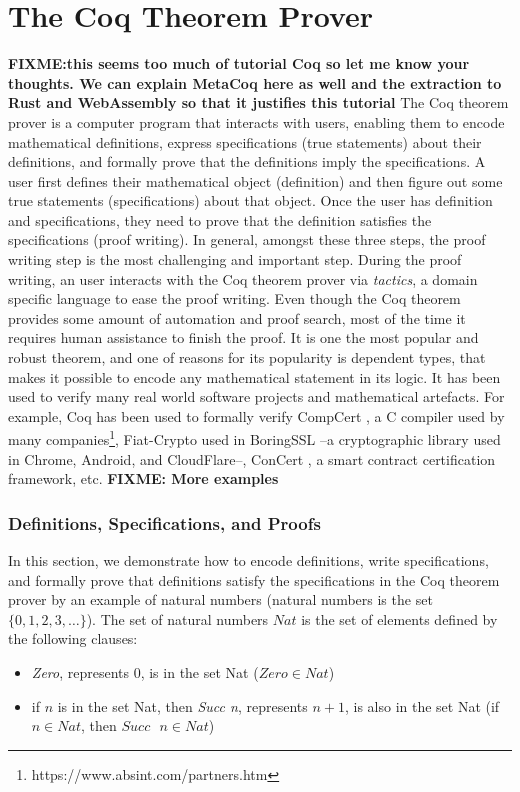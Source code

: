 \documentclass[conference,compsoc]{IEEEtran}
\begin{document}
\section{The Coq Theorem Prover}
\textbf{FIXME:this seems too much of tutorial Coq so let me know your thoughts. We 
can explain MetaCoq here as well and the extraction to Rust and WebAssembly
so that it justifies this tutorial}
The Coq theorem prover \cite{the_coq_development_team} is a computer program that interacts with users, 
enabling them to encode mathematical definitions, express specifications (true statements) about 
their definitions, and formally prove that the definitions imply the specifications. 
A user first defines their mathematical object (definition) and then figure 
out some  true statements (specifications) about 
that object. Once the user has definition 
and specifications, they need to prove 
that the definition satisfies the specifications 
(proof writing). In general, amongst these three steps, 
the proof writing step is the most challenging and important step. 
During the proof writing, an user interacts with the Coq theorem prover 
via \emph{tactics}, a domain specific language 
to ease the proof writing. Even though the Coq theorem 
provides some amount of automation and proof 
search, most of the time it requires human assistance to finish the proof. 
It is one the most popular and robust theorem, and
one of reasons for its popularity is 
dependent types, that makes it possible to encode
any mathematical statement in its logic.
It has been used to verify many real world software projects and mathematical 
artefacts. For example, Coq has been used to 
formally verify CompCert \cite{10.1145/1111037.1111042}, 
a C compiler used by many companies\footnote{https://www.absint.com/partners.htm}, 
Fiat-Crypto \cite{8835346} 
used in BoringSSL --a cryptographic library used in Chrome, Android, 
and CloudFlare--, ConCert \cite{10.1145/3372885.3373829}, 
a smart contract certification framework, etc. \textbf{FIXME: More examples}



\subsubsection*{Definitions, Specifications, and Proofs}
In this section, we demonstrate how to encode definitions, write specifications,
and formally prove that definitions satisfy the specifications 
in the Coq theorem prover by an example of 
natural numbers (natural numbers is the set $\{0, 1, 2, 3, \dots \}$). 
The set of natural numbers $Nat$ is the set of elements defined by the 
following clauses:
\begin{itemize}
  \item \emph{Zero}, represents $0$, is in the set Nat ($Zero \in Nat$)
  \item if $n$ is in the set Nat, then \emph{Succ n}, represents $n + 1$, 
    is also in the set Nat (if $n \in Nat$, then $Succ \text{ }n \in Nat$)
\end{itemize}
\end{document}

